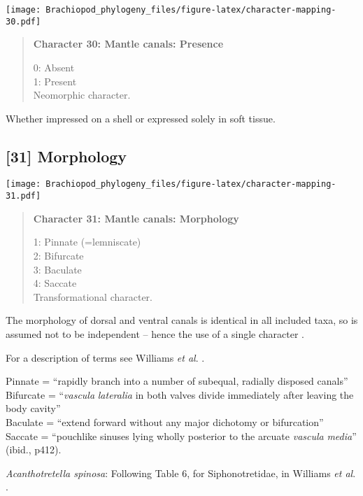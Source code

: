 \documentclass[openany]{book}
\theoremstyle{definition}
\theoremstyle{definition}
\theoremstyle{definition}
\theoremstyle{remark}
\begin{document}
\texttt{[image: Brachiopod\_phylogeny\_files/figure-latex/character-mapping-30.pdf]}

\begin{quote}
\textbf{Character 30: Mantle canals: Presence}

0: Absent\\
1: Present\\
Neomorphic character.
\end{quote}

Whether impressed on a shell or expressed solely in soft tissue.

\subsection*{{[}31{]} Morphology}\label{morphology-1}

\texttt{[image: Brachiopod\_phylogeny\_files/figure-latex/character-mapping-31.pdf]}

\begin{quote}
\textbf{Character 31: Mantle canals: Morphology}

1: Pinnate (=lemniscate)\\
2: Bifurcate\\
3: Baculate\\
4: Saccate\\
Transformational character.
\end{quote}

The morphology of dorsal and ventral canals is identical in all included
taxa, so is assumed not to be independent -- hence the use of a single
character \citep[contra][]{Williams2000LinguliformeaCraniiformea}.

For a description of terms see Williams \emph{et al}.
\citeyearpar[2000]{Williams1997Introduction}.

Pinnate = ``rapidly branch into a number of subequal, radially disposed
canals''\\
Bifurcate = ``\emph{vascula} \emph{lateralia} in both valves divide
immediately after leaving the body cavity''\\
Baculate = ``extend forward without any major dichotomy or bifurcation''
\citep[ p.~418]{Williams1997Introduction}\\
Saccate = ``pouchlike sinuses lying wholly posterior to the arcuate
\emph{vascula} \emph{media}'' (ibid., p412).

\hypertarget{Acanthotretella_spinosa-coding-31}{}
\emph{Acanthotretella spinosa}: Following Table 6, for Siphonotretidae,
in Williams \emph{et al}.
\citeyearpar{Williams2000LinguliformeaCraniiformea}.
\end{document}
